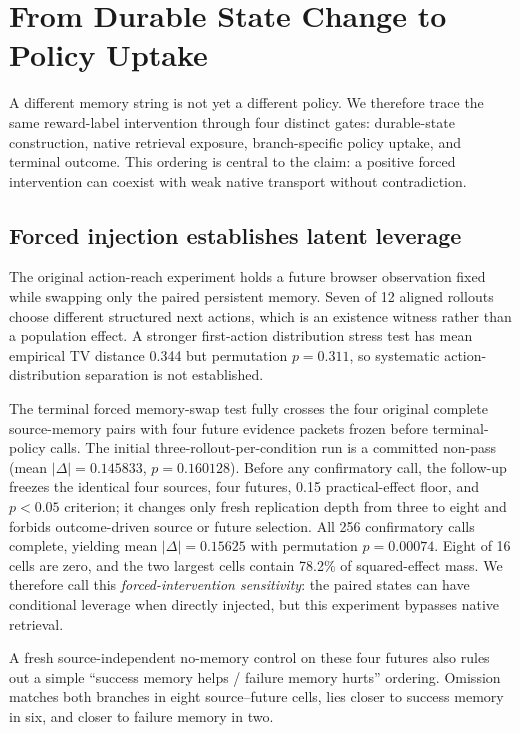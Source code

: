\section{From Durable State Change to Policy Uptake}
\label{sec:variance}
A different memory string is not yet a different policy. We therefore trace the same reward-label intervention through four distinct gates: durable-state construction, native retrieval exposure, branch-specific policy uptake, and terminal outcome. This ordering is central to the claim: a positive forced intervention can coexist with weak native transport without contradiction.

\subsection{Forced injection establishes latent leverage}
The original action-reach experiment holds a future browser observation fixed while swapping only the paired persistent memory. Seven of 12 aligned rollouts choose different structured next actions, which is an existence witness rather than a population effect. A stronger first-action distribution stress test has mean empirical TV distance 0.344 but permutation $p=0.311$, so systematic action-distribution separation is not established.

The terminal forced memory-swap test fully crosses the four original complete source-memory pairs with four future evidence packets frozen before terminal-policy calls. The initial three-rollout-per-condition run is a committed non-pass (mean $|\Delta|=0.145833$, $p=0.160128$). Before any confirmatory call, the follow-up freezes the identical four sources, four futures, 0.15 practical-effect floor, and $p<0.05$ criterion; it changes only fresh replication depth from three to eight and forbids outcome-driven source or future selection. All 256 confirmatory calls complete, yielding mean $|\Delta|=0.15625$ with permutation $p=0.00074$. Eight of 16 cells are zero, and the two largest cells contain 78.2\% of squared-effect mass. We therefore call this \emph{forced-intervention sensitivity}: the paired states can have conditional leverage when directly injected, but this experiment bypasses native retrieval.

A fresh source-independent no-memory control on these four futures also rules out a simple ``success memory helps / failure memory hurts'' ordering. Omission matches both branches in eight source--future cells, lies closer to success memory in six, and closer to failure memory in two.

